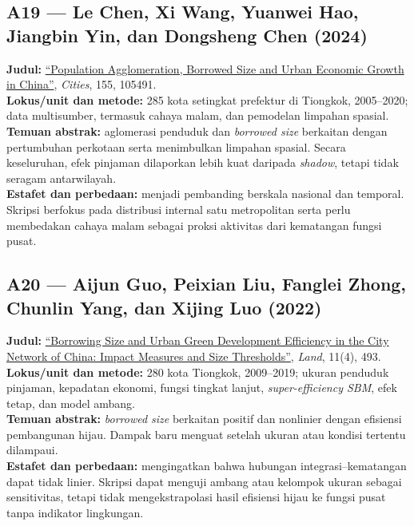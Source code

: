 \documentclass[
  indonesian,
  11pt,
  a4paper,
  oneside,
  openany]{report}
\begin{document}
\subsection{A19 --- Le Chen, Xi Wang, Yuanwei Hao, Jiangbin Yin, dan
Dongsheng Chen
(2024)}\label{a19-le-chen-xi-wang-yuanwei-hao-jiangbin-yin-dan-dongsheng-chen-2024}

\textbf{Judul:}
\href{https://doi.org/10.1016/j.cities.2024.105491}{``Population
Agglomeration, Borrowed Size and Urban Economic Growth in China''},
\emph{Cities}, 155, 105491.\\
\textbf{Lokus/unit dan metode:} 285 kota setingkat prefektur di
Tiongkok, 2005--2020; data multisumber, termasuk cahaya malam, dan
pemodelan limpahan spasial.\\
\textbf{Temuan abstrak:} aglomerasi penduduk dan \emph{borrowed size}
berkaitan dengan pertumbuhan perkotaan serta menimbulkan limpahan
spasial. Secara keseluruhan, efek pinjaman dilaporkan lebih kuat
daripada \emph{shadow}, tetapi tidak seragam antarwilayah.\\
\textbf{Estafet dan perbedaan:} menjadi pembanding berskala nasional dan
temporal. Skripsi berfokus pada distribusi internal satu metropolitan
serta perlu membedakan cahaya malam sebagai proksi aktivitas dari
kematangan fungsi pusat.

\subsection{A20 --- Aijun Guo, Peixian Liu, Fanglei Zhong, Chunlin Yang,
dan Xijing Luo
(2022)}\label{a20-aijun-guo-peixian-liu-fanglei-zhong-chunlin-yang-dan-xijing-luo-2022}

\textbf{Judul:} \href{https://doi.org/10.3390/land11040493}{``Borrowing
Size and Urban Green Development Efficiency in the City Network of
China: Impact Measures and Size Thresholds''}, \emph{Land}, 11(4),
493.\\
\textbf{Lokus/unit dan metode:} 280 kota Tiongkok, 2009--2019; ukuran
penduduk pinjaman, kepadatan ekonomi, fungsi tingkat lanjut,
\emph{super-efficiency SBM}, efek tetap, dan model ambang.\\
\textbf{Temuan abstrak:} \emph{borrowed size} berkaitan positif dan
nonlinier dengan efisiensi pembangunan hijau. Dampak baru menguat
setelah ukuran atau kondisi tertentu dilampaui.\\
\textbf{Estafet dan perbedaan:} mengingatkan bahwa hubungan
integrasi--kematangan dapat tidak linier. Skripsi dapat menguji ambang
atau kelompok ukuran sebagai sensitivitas, tetapi tidak mengekstrapolasi
hasil efisiensi hijau ke fungsi pusat tanpa indikator lingkungan.
\end{document}
